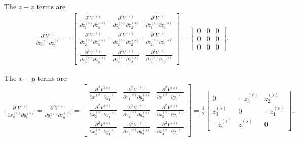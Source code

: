 \documentclass[12pt,aps,pre]{revtex4}
\begin{document}
The $z-z$ terms are
%
\begin{eqnarray}
\frac{\partial^2V^{(s)}}{\partial z_a^{(s)} \partial z_b^{(s)}} = 
\begin{bmatrix}
\frac{\partial^2V^{(s)}}{\partial z_1^{(s)} \partial z_1^{(s)}} & \frac{\partial^2V^{(s)}}{\partial z_1^{(s)} \partial z_2^{(s)}}  & \frac{\partial^2V^{(s)}}{\partial z_1^{(s)} \partial z_3^{(s)}} \\
%
\frac{\partial^2V^{(s)}}{\partial z_2^{(s)} \partial z_1^{(s)}} & \frac{\partial^2V^{(s)}}{\partial z_2^{(s)} \partial z_2^{(s)}}  & \frac{\partial^2V^{(s)}}{\partial z_2^{(s)} \partial z_3^{(s)}} \\
%
\frac{\partial^2V^{(s)}}{\partial z_3^{(s)} \partial z_1^{(s)}} & \frac{\partial^2V^{(s)}}{\partial z_3^{(s)} \partial z_2^{(s)}}  & \frac{\partial^2V^{(s)}}{\partial z_3^{(s)} \partial z_3^{(s)}}
\end{bmatrix} =
\begin{bmatrix}
0 & 0 & 0 \\
0 & 0 & 0 \\
0 & 0 & 0
\end{bmatrix}.
\end{eqnarray}
%

The $x-y$ terms are
%
\begin{eqnarray}
\frac{\partial^2V^{(s)}}{\partial x_a^{(s)} \partial y_b^{(s)}} = \frac{\partial^2V^{(s)}}{\partial y_a^{(s)} \partial x_b^{(s)}}=
\begin{bmatrix}
\frac{\partial^2V^{(s)}}{\partial x_1^{(s)} \partial y_1^{(s)}} & \frac{\partial^2V^{(s)}}{\partial x_1^{(s)} \partial y_2^{(s)}}  & \frac{\partial^2V^{(s)}}{\partial x_1^{(s)} \partial y_3^{(s)}} \\
%
\frac{\partial^2V^{(s)}}{\partial x_2^{(s)} \partial y_1^{(s)}} & \frac{\partial^2V^{(s)}}{\partial x_2^{(s)} \partial y_2^{(s)}}  & \frac{\partial^2V^{(s)}}{\partial x_2^{(s)} \partial y_3^{(s)}} \\
%
\frac{\partial^2V^{(s)}}{\partial x_3^{(s)} \partial y_1^{(s)}} & \frac{\partial^2V^{(s)}}{\partial x_3^{(s)} \partial y_2^{(s)}}  & \frac{\partial^2V^{(s)}}{\partial x_3^{(s)} \partial y_3^{(s)}}
\end{bmatrix} =
\frac{1}{2}
\begin{bmatrix}
0 & -z_3^{(s)} & z_2^{(s)} \\
z_3^{(s)} & 0 & -z_1^{(s)} \\
-z_2^{(s)} & z_1^{(s)} & 0
\end{bmatrix}.
\end{eqnarray}
%
\end{document}
